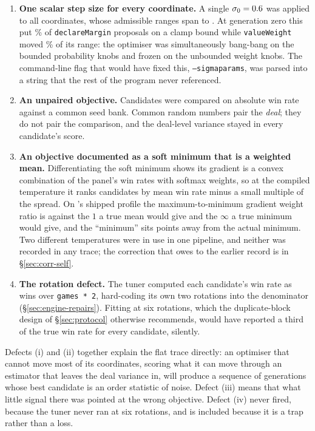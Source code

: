 \begin{enumerate}
  \item \textbf{One scalar step size for every coordinate.} A single
        $\sigma_0 = 0.6{}$ was applied to all \numVfiveParams{}
        coordinates, whose admissible ranges span \numSigmaRangeMin{} to
        \numSigmaRangeMax{}. At generation zero this put
        \numClipDeclMargin{}\% of \texttt{declareMargin} proposals on a clamp
        bound while \texttt{valueWeight} moved \numValueWeightStep{}\% of its
        range: the optimiser was simultaneously bang-bang on the bounded
        probability knobs and frozen on the unbounded weight knobs. The
        command-line flag that would have fixed this, \texttt{--sigmaparams}, was
        parsed into a string that the rest of the program never referenced.
  \item \textbf{An unpaired objective.} Candidates were compared on absolute win
        rate against a common seed bank. Common random numbers pair the
        \emph{deal}; they do not pair the comparison, and the deal-level variance
        stayed in every candidate's score.
  \item \textbf{An objective documented as a soft minimum that is a weighted
        mean.} Differentiating the soft minimum shows its gradient is a convex
        combination of the panel's win rates with softmax weights, so at the
        compiled temperature it ranks candidates by mean win rate minus a small
        multiple of the spread. On \vfour{}'s shipped profile the
        maximum-to-minimum gradient weight ratio is \numSoftMinRatioFour{}
        against the $1$ a true mean would give and the $\infty$ a true minimum
        would give, and the ``minimum'' sits \numSoftMinBelowMin{} points away
        from the actual minimum. Two different temperatures were in use in one
        pipeline, and neither was recorded in any trace; the correction that owes
        to the earlier record is in \S\ref{sec:corr-self}.
  \item \textbf{The rotation defect.} The tuner computed each candidate's win
        rate as wins over \verb|games * 2|, hard-coding its own two rotations
        into the denominator (\S\ref{sec:engine-repairs}). Fitting at six
        rotations, which the duplicate-block design of \S\ref{sec:protocol}
        otherwise recommends, would have reported a third of the true win rate
        for every candidate, silently.
\end{enumerate}

Defects (i) and (ii) together explain the flat trace directly: an optimiser that
cannot move most of its coordinates, scoring what it can move through an
estimator that leaves the deal variance in, will produce a sequence of
generations whose best candidate is an order statistic of noise. Defect (iii)
means that what little signal there was pointed at the wrong objective. Defect
(iv) never fired, because the tuner never ran at six rotations, and is included
because it is a trap rather than a loss.


